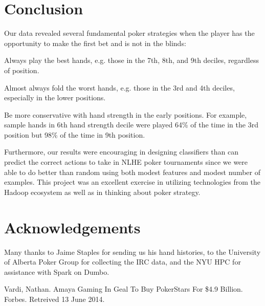 \documentclass[twoside]{article}
\begin{document}
\begin{multicols}{2}

\section{Conclusion}

Our data revealed several fundamental poker strategies when the player has the opportunity to make the first bet and is not in the blinds:
\begin{compactitem}
\item{} Always play the best hands, e.g. those in the 7th, 8th, and 9th deciles, regardless of position. 
\item{} Almost always fold the worst hands, e.g. those in the 3rd and 4th deciles, especially in the lower positions.
\item{}Be more conservative with hand strength in the early positions. For example, sample hands in 6th hand strength decile were played 64\% of the time in the 3rd position but 98\% of the time in 9th position.
\end{compactitem}
Furthermore, our results were encouraging in designing classifiers than can predict the correct actions to take in NLHE poker tournaments since we were able to do better than random using both modest features and modest number of examples. This project was an excellent exercise in utilizing technologies from the Hadoop ecosystem as well as in thinking about poker strategy.



\section{Acknowledgements}

Many thanks to Jaime Staples for sending us his hand histories, to the University of Alberta Poker Group for collecting the IRC data, and the NYU HPC for assistance with Spark on Dumbo. 



\begin{thebibliography}{99} %

 Vardi, Nathan. Amaya Gaming In Geal To Buy PokerStars For \$4.9 Billion. Forbes. Retreived 13 June 2014. 


\end{thebibliography}
\end{multicols}
\end{document}
